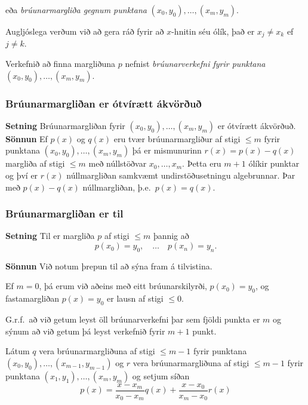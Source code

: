 \documentclass[icelandic,a4paper,12pt]{article}
\begin{document}
\pause
eða {\em brúunarmargliða gegnum punktana} $(x_0,y_0), \ldots, (x_m,y_m)$. 

\smallskip
Augljóslega verðum 
við að gera ráð fyrir að $x$-hnitin séu ólík, það er $x_j \not= x_k$ ef $j
\not= k$.  

\pause
\smallskip
Verkefnið að finna margliðuna $p$ nefnist {\em brúunarverkefni fyrir
  punktana}
 $(x_0,y_0), \ldots, (x_m,y_m)$.


\subsubsection{Brúunarmargliðan er ótvírætt ákvörðuð} 
\textbf{Setning}
 Brúunarmargliðan fyrir $(x_0,y_0),\ldots,(x_m,y_m)$ er ótvírætt
 ákvörðuð.
\pause
\textbf{Sönnun}
Ef $p(x)$ og $q(x)$ eru tvær brúunarmargliður af stigi $\leq m$ 
fyrir punktana $(x_0,y_0), \ldots, (x_m,y_m)$ 
þá er mismunurinn $r(x) = p(x) - q(x)$ margliða af stigi $\leq m$ 
með núllstöðvar $x_0, \ldots, x_m$. 
\pause
Þetta eru $m+1$ ólíkir punktar 
og því er $r(x)$ núllmargliðan samkvæmt undirstöðusetningu algebrunnar. 
\pause
Þar með $p(x) - q(x)$ núllmargliðan, þ.e.~$p(x) = q(x)$.



\subsubsection{Brúunarmargliðan er til} 

\textbf{Setning}
 Til er margliða $p$ af stigi $\leq m$ þannig að 
 $$
  p(x_0) = y_0, \quad \ldots \quad p(x_n)=y_n.
  $$

\pause
\textbf{Sönnun}
 Við notum þrepun til að sýna fram á tilvistina. 

\pause
Ef $m = 0$, þá erum 
við aðeins með eitt brúunarskilyrði, $p(x_0) = y_0$, og
fastamargliðan  $p(x) = y_0$ er lausn af stigi $\leq 0$.

\pause
\smallskip
G.r.f.~að við getum leyst öll brúunarverkefni 
þar sem fjöldi punkta er $m$ og sýnum að við getum þá leyst verkefnið
fyrir $m+1$ punkt. 

\pause
\smallskip
Látum $q$ vera brúunarmargliðuna 
af stigi $\leq m-1$ fyrir punktana $(x_0,y_0), \ldots,
(x_{m-1},y_{m-1})$  og $r$ vera  brúunarmargliðuna af stigi $\leq m-1$
fyrir punktana $(x_1,y_1), \ldots, (x_m,y_m)$ og setjum síðan
\begin{equation*}
  p(x) = \frac{x-x_m}{x_0-x_m}q(x) + \frac{x-x_0}{x_m-x_0}r(x)
\end{equation*}
\end{document}
